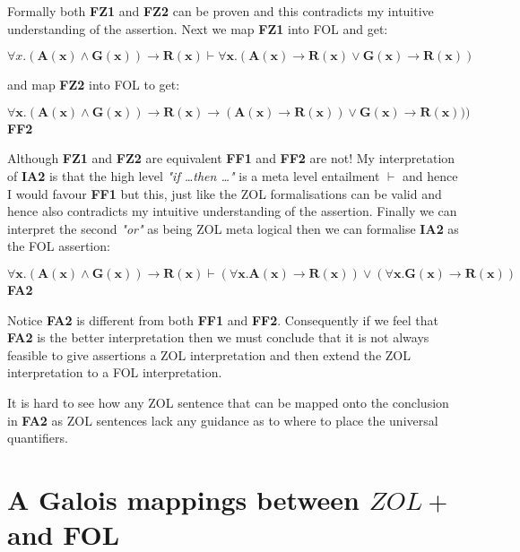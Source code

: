 
Formally both {\bf FZ1} and {\bf FZ2} can be proven and this contradicts my intuitive understanding of the assertion.
Next we  map  {\bf FZ1} into FOL and get:

\noindent \hspace{\fill}$  \forall x.  \mathbf{(A(x)\wedge G(x))   \rightarrow R(x)}\vdash
\mathbf{\forall x. (A(x)\rightarrow R(x)\vee G(x)\rightarrow R(x))}$\hspace{\fill}{\bf FF1}

and map  {\bf FZ2} into FOL to get:

\noindent \hspace{\fill}$\mathbf{ \forall x. (A(x)\wedge G(x)) \rightarrow R(x)  \rightarrow   (A(x) \rightarrow R(x)) \vee   G(x) \rightarrow R(x)))}$\hspace{\fill} {\bf FF2}


\noindent Although {\bf FZ1} and {\bf FZ2} are equivalent {\bf FF1} and {\bf FF2} are not! My interpretation of {\bf IA2} is that the high level \emph{"if \ldots then \ldots"}  is a meta level entailment $\vdash$ and hence I would favour {\bf FF1} but this, just like the ZOL formalisations can be valid and hence also contradicts my intuitive understanding of the assertion. Finally we can interpret the second \emph{"or"} as being ZOL meta logical then we can  formalise {\bf IA2} as   the FOL  assertion:

\noindent \hspace{\fill}$\mathbf {\forall x. (A(x)\wedge G(x)) \rightarrow R(x)  \vdash  
(\forall x.  A(x) \rightarrow R(x)) \vee (\forall x.  G(x) \rightarrow R(x))}$\hspace{\fill} {\bf FA2}

Notice {\bf FA2} is different from both {\bf FF1} and {\bf FF2}. Consequently if we feel that {\bf FA2} is the better interpretation then we must conclude that it is not always feasible to give assertions a ZOL interpretation and then extend the ZOL interpretation to a FOL interpretation.

It is hard to see how any  ZOL sentence that can be mapped onto the conclusion in  {\bf FA2} as  ZOL sentences lack any guidance as to where to place the universal quantifiers. 





\section{A Galois  mappings between $ZOL+$ and FOL} 
\label{sec:Gal}





